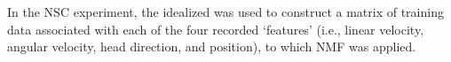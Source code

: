 In the \ac{NSC} experiment, the idealized 
was used to construct a matrix of training data associated with each of the four recorded `features' (i.e., linear velocity, angular velocity, head direction, and position), to which \ac{NMF} was applied.



